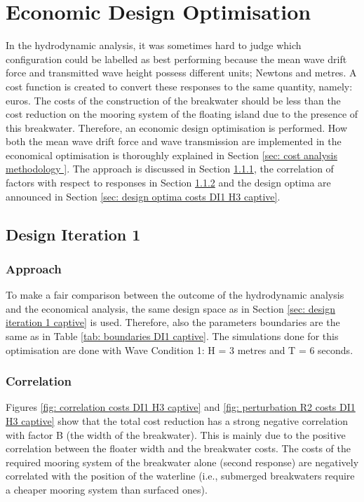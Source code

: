 


\chapter{Economic Design Optimisation}
\label{ch: economical design optimisation }

In the hydrodynamic analysis, it was sometimes hard to judge which configuration could be labelled as best performing because the mean wave drift force and transmitted wave height possess different units; Newtons and metres. A cost function is created to convert these responses to the same quantity, namely: euros. The costs of the construction of the breakwater should be less than the cost reduction on the mooring system of the floating island due to the presence of this breakwater. Therefore, an economic design optimisation is performed. How both the mean wave drift force and wave transmission are implemented in the economical optimisation is thoroughly explained in Section \ref{sec: cost analysis methodology }. The approach is discussed in Section \ref{sec: approach costs DI1 H3 captive}, the correlation of factors with respect to responses in Section \ref{sec: correlation costs DI1 H3 captive} and the design optima are announced in Section \ref{sec: design optima costs DI1 H3 captive}.

\section{{Design Iteration 1}}

\subsection{Approach}
\label{sec: approach costs DI1 H3 captive}

To make a fair comparison between the outcome of the hydrodynamic analysis and the economical analysis, the same design space as in Section \ref{sec: design iteration 1 captive} is used. Therefore, also the parameters boundaries are the same as in Table \ref{tab: boundaries DI1 captive}. The simulations done for this optimisation are done with Wave Condition 1: H = 3 metres and T = 6 seconds. 


\subsection{Correlation}
\label{sec: correlation costs DI1 H3 captive}

Figures \ref{fig: correlation costs DI1 H3 captive} and \ref{fig: perturbation R2 costs DI1 H3 captive} show that the total cost reduction has a strong negative correlation with factor B (the width of the breakwater). This is mainly due to the positive correlation between the floater width and the breakwater costs. The costs of the required mooring system of the breakwater alone (second response) are negatively correlated with the position of the waterline (i.e., submerged breakwaters require a cheaper mooring system than surfaced ones). 

